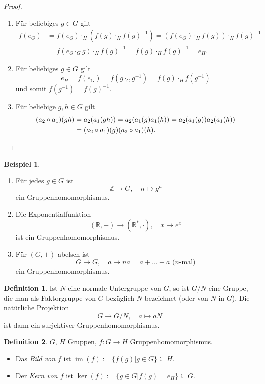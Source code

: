 \documentclass[12pt]{scrartcl} %
\DeclareMathOperator{\im}{im}
\theoremstyle{definition}
\newtheorem*{defn}{Definition}
\newtheorem{ex}{Beispiel}
\theoremstyle{remark}
\newcommand{\defi}{\emph}
\begin{document}
\begin{proof}
	\begin{enumerate}
	\item Für beliebiges \(g \in G\) gilt
		\begin{align*}
			f(e_G) &= f(e_G)\cdot_H(f(g)\cdot_Hf(g)^{-1}) = (f(e_G)\cdot_Hf(g))\cdot_Hf(g)^{-1}\\
			&= f(e_G\cdot_Gg)\cdot_Hf(g)^{-1} = f(g)\cdot_Hf(g)^{-1} = e_H.
		\end{align*}
	\item Für beliebiges \(g \in G\) gilt \[e_H=f(e_G)=f(g\cdot_G g^{-1})=f(g)\cdot_{H}f(g^{-1})\] und somit \(f(g^{-1})=f(g)^{-1}\).
	\item Für beliebige \(g, h \in G\) gilt
		\begin{align*}
			(a_2\circ a_1)(gh) &= a_2(a_1(gh)) = a_2(a_1(g)a_1(h)) = a_2(a_1(g))a_2(a_1(h))\\
			&= (a_2\circ a_1)(g)(a_2\circ a_1)(h).\qedhere
		\end{align*}
	\end{enumerate}
\end{proof}

\begin{ex}
	\begin{enumerate}
	\item Für jedes $g \in G$ ist
		$$\mathbb{Z} \rightarrow G, \quad n \mapsto g^n$$
		ein Gruppenhomomorphismus.
	\item Die Exponentialfunktion
		$$(\mathbb{R},+)\rightarrow(\mathbb{R}^*,\cdot), \quad x\mapsto e^x$$
		ist ein Gruppenhomomorphismus.
	\item Für $(G,+)$ abelsch ist
		$$G\rightarrow G, \quad a\mapsto na = a+\dots+a \text{ (\(n\)-mal)}$$
		ein Gruppenhomomorphismus.
	\end{enumerate}
\end{ex}

\begin{defn}
	Ist $N$ eine normale Untergruppe von $G$, so ist $G/N$ eine Gruppe, die man als Faktorgruppe von $G$ bezüglich $N$ bezeichnet (oder von $N$ in $G$).
	Die natürliche Projektion $$G\rightarrow G/N, \quad a\mapsto aN$$ ist dann ein surjektiver Gruppenhomomorphismus.
\end{defn}

\begin{defn}
	$G$, $H$ Gruppen, $f: G \rightarrow H$ Gruppenhomomorphismus.
	\begin{itemize}
	\item Das \defi{Bild von $f$} ist $\im(f) := \{f(g) | g \in G\} \subseteq H$.
	\item Der \defi{Kern von $f$} ist $\ker(f) := \{g \in G | f(g) = e_H\} \subseteq G$.
	\end{itemize}
\end{defn}
\end{document}
